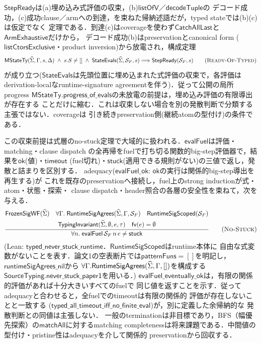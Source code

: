 $\mathsf{StepReady}$は(a)埋め込み式評価の収束，(b)$\mathsf{listOfV}$／$\mathsf{decodeTuple}$の
デコード成功，(c)成功clause／armへの到達，を束ねた帰納述語だが，typed stateでは(b)(c)は仮定でなく
定理である．到達(c)はcoverageを使わず$\mathsf{CatchAllLast}$と$\mathsf{ArmExhaustive}$だけから，
デコード成功(b)はpreservationとcanonical form
($\mathsf{listCtorsExclusive}$・product inversion)から放電され，構成定理
\[
\mathsf{MStateTy}(\Sighat,\Gamma,s,\Delta)
\;\land\;
s.S \neq []
\;\land\;
\mathsf{StateEvals}(\Sighat,\mathcal S_F,s)
\Longrightarrow
\mathsf{StepReady}(\mathcal S_F,s)
\tag{\textsc{Ready-Of-Typed}}
\]
が成り立つ($\mathsf{StateEvals}$は先頭位置に埋め込まれた式評価の収束で，各評価は
derivation-localなruntime-signature agreementを伴う)．従って公開の局所progress
$\mathsf{MStateTy.progress\_of\_evals}$の未放電の前提は，埋め込み評価の有限導出が存在する
ことだけに縮む．これは収束しない場合を別の発散判断で分類する主張ではない．coverageは
引き続きpreservation側(継続atomの型付け)の条件である．

この収束前提は式層のno-stuck定理で大域的に扱われる．$\mathsf{evalFuel}$は評価・matching・clause dispatch
の全再帰をfuelで打ち切る関数的big-step評価器で，結果を$\mathsf{ok}$(値)・$\mathsf{timeout}$
(fuel切れ)・$\mathsf{stuck}$(適用できる規則がない)の三値で返し，発散と詰まりを区別する．
adequacy($\mathsf{evalFuel\_ok}$: $\mathsf{ok}$の実行は関係的big-step導出を再生する)が
これを既存のpreservationへ接続し，fuel上のstrong inductionが式・atom・状態・探索・
clause dispatch・header照合の各層の安全性を束ねて，次を与える．
\[
\frac{
  \begin{gathered}
  \mathsf{FrozenSigWF}(\Sighat)
  \quad
  \forall\Gamma.\;\mathsf{RuntimeSigAgrees}(\Sighat,\Gamma,\mathcal S_F)
  \quad
  \mathsf{RuntimeSigScoped}(\mathcal S_F)\\
  \mathsf{TypingInvariant}(\Sighat,\emptyset,e,\tau)
  \quad
  \mathsf{fv}(e)=\emptyset
  \end{gathered}
}{
  \forall n.\; \mathsf{evalFuel}\,\mathcal S_F\,n\,e \neq \mathsf{stuck}
}
\tag{\textsc{No-Stuck}}
\]
(Lean: $\mathsf{typed\_never\_stuck\_runtime}$．$\mathsf{RuntimeSigScoped}$はruntime本体に
自由な式変数がないことを表す．論文1の空表断片では$\mathsf{patternFuns}=[]$を明記し，
$\mathsf{runtimeSigAgrees\_nil}$から
$\forall\Gamma.\mathsf{RuntimeSigAgrees}(\widehat{\Sigma},\Gamma,[])$を構成する
$\mathsf{SourceTyping.never\_stuck\_paper1}$を用いる．)
$\mathsf{evalFuel\_eventually\_ok}$は，有限の関係的評価があれば十分大きいすべてのfuelで
同じ値を返すことを示す．従ってadequacyと合わせると，全fuelでのtimeoutは有限の関係的
評価が存在しないことと一致する
($\mathsf{typed\_all\_timeout\_iff\_no\_finite\_eval}$)が，別に定義した余帰納的な
発散判断との同値は主張しない．
一般のterminationは非目標であり，BFS（幅優先探索）の$\mathsf{matchAll}$に対するmatching
completenessは将来課題である．中間値の型付け・pristine性はadequacyを介して関係的
preservationから回収する．

